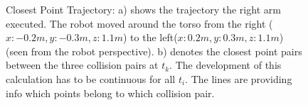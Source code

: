 \begin{figure}[h!]
  \centering
\caption{Closest Point Trajectory: a) shows the trajectory the right arm executed. The robot moved around the torso from the right ($x:-0.2m,y:-0.3m,z:1.1m$) to the left($x:0.2m,y:0.3m,z:1.1m$) (seen from the robot perspective). b) denotes the closest point pairs between the three collision pairs at $t_k$. The development of this calculation has to be continuous for all $t_i$. The lines are providing info which points belong to which collision pair.  } 
    \label{fig:cpexperiment}
\end{figure}

